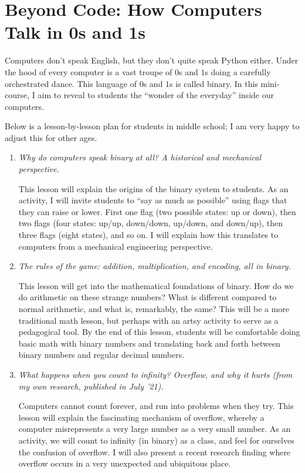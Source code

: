 \section{Beyond Code: How Computers Talk in 0s and 1s}
\label{appendix:pitch}

Computers don't speak English, but they don't quite speak Python either.
Under the hood of every computer is a vast troupe of $0$s and $1$s doing a carefully orchestrated dance.
This language of $0$s and $1$s is called binary.
In this mini-course, I aim to reveal to students the ``wonder of the everyday'' inside our computers.

Below is a lesson-by-lesson plan for students in middle school; I am very happy to adjust this for other ages.

\begin{enumerate}
  \item \emph{Why do computers speak binary at all? A historical and mechanical perspective.}

  This lesson will explain the origins of the binary system to students.
  As an activity, I will invite students to ``say as much as possible'' using flags that they can raise or lower.
  First one flag (two possible states: up or down), then two flags (four states: up/up, down/down, up/down, and down/up), then three flags (eight states), and so on.
  I will explain how this translates to computers from a mechanical engineering perspective.

  \item \emph{The rules of the game: addition, multiplication, and encoding, all in binary.}

  This lesson will get into the mathematical foundations of binary.
  How do we do arithmetic on these strange numbers?
  What is different compared to normal arithmetic, and what is, remarkably, the same?
  This will be a more traditional math lesson, but perhaps with an artsy activity to serve as a pedagogical tool.
  By the end of this lesson, students will be comfortable doing basic math with binary numbers and translating back and forth between binary numbers and regular decimal numbers.

  \item \emph{What happens when you count to infinity? Overflow, and why it hurts (from my own research, published in July '21).}

  Computers cannot count forever, and run into problems when they try.
  This lesson will explain the fascinating mechanism of overflow, whereby a computer misrepresents a very large number as a very small number.
  As an activity, we will count to infinity (in binary) as a class, and feel for ourselves the confusion of overflow.
  I will also present a recent research finding where overflow occurs in a very unexpected and ubiquitous place.


\end{enumerate}
